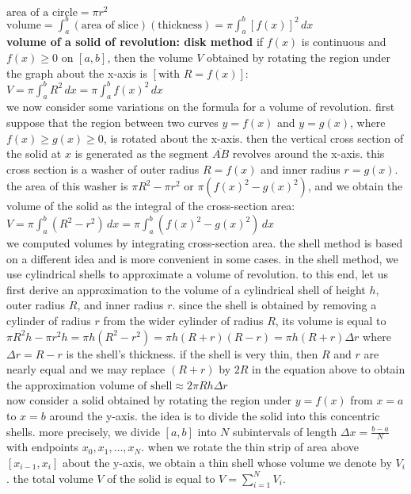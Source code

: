\documentclass{article}
\begin{document}
$\text{area of a circle} = \pi r^2$\\
$\text{volume} = \int_{a}^{b}(\text{area of slice})(\text{thickness}) = \pi\int_{a}^{b}[f(x)]^2\,dx$\\

\textbf{volume of a solid of revolution: disk method} if $f(x)$ is continuous and $f(x) \geq 0$ on $[a, b]$, then the volume $V$ obtained by rotating the region under the graph about the x-axis is $[\text{with } R = f(x)]$:\\ $V = \pi\int_{a}^{b}R^2\,dx = \pi\int_{a}^{b}f(x)^2\,dx$\\

we now consider some variations on the formula for a volume of revolution. first suppose that the region between two curves $y = f(x)$ and $y = g(x)$, where $f(x) \geq g(x) \geq 0$, is rotated about the x-axis. then the vertical cross section of the solid at $x$ is generated as the segment $\overline{AB}$ revolves around the x-axis. this cross section is a washer of outer radius $R = f(x)$ and inner radius $r = g(x)$. the area of this washer is $\pi R^2 - \pi r^2$ or $\pi(f(x)^2 - g(x)^2)$, and we obtain the volume of the solid as the integral of the cross-section area:\\ $V = \pi \int_{a}^{b}(R^2 - r^2)\,dx = \pi \int_{a}^{b}(f(x)^2 - g(x)^2)\,dx$\\

we computed volumes by integrating cross-section area. the shell method is based on a different idea and is more convenient in some cases. in the shell method, we use cylindrical shells to approximate a volume of revolution. to this end, let us first derive an approximation to the volume of a cylindrical shell of height $h$, outer radius $R$, and inner radius $r$. since the shell is obtained by removing a cylinder of radius $r$ from the wider cylinder of radius $R$, its volume is equal to  $\pi R^2h - \pi r^2h = \pi h(R^2 - r^2) = \pi h(R + r)(R - r) = \pi h(R + r)\Delta r$ where $\Delta r = R - r$ is the shell's thickness. if the shell is very thin, then $R$ and $r$ are nearly equal and we may replace $(R + r)$ by $2R$ in the equation above to obtain the approximation $\text{volume of shell} \approx 2\pi Rh\Delta r$\\

now consider a solid obtained by rotating the region under $y = f(x)$ from $x = a$ to $x = b$ around the y-axis. the idea is to divide the solid into this concentric shells. more precisely, we divide $[a, b]$ into $N$ subintervals of length $\Delta x = \frac{b - a}{N}$ with endpoints $x_0, x_1, \ldots, x_N$. when we rotate the thin strip of area above $[x_{i - 1}, x_i]$ about the y-axis, we obtain a thin shell whose volume we denote by $V_i$. the total volume $V$ of the solid is equal to $V = \sum_{i=1}^{N}V_i$.\\
\end{document}
